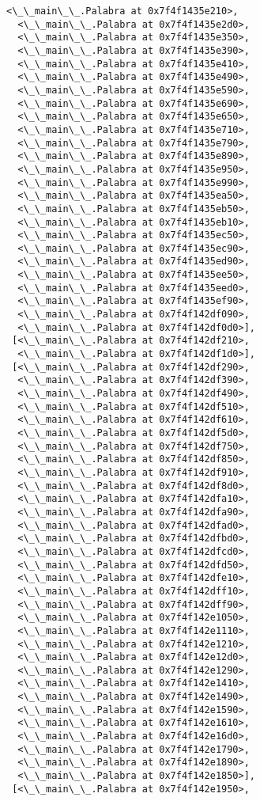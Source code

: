 \documentclass[12pt,a4paper,table]{article}
\begin{document}
\begin{tcolorbox}[breakable, size=fbox, boxrule=.5pt, pad at break*=1mm, opacityfill=0]
\begin{Verbatim}[commandchars=\\\{\}]
  <\_\_main\_\_.Palabra at 0x7f4f1435e210>,
  <\_\_main\_\_.Palabra at 0x7f4f1435e2d0>,
  <\_\_main\_\_.Palabra at 0x7f4f1435e350>,
  <\_\_main\_\_.Palabra at 0x7f4f1435e390>,
  <\_\_main\_\_.Palabra at 0x7f4f1435e410>,
  <\_\_main\_\_.Palabra at 0x7f4f1435e490>,
  <\_\_main\_\_.Palabra at 0x7f4f1435e590>,
  <\_\_main\_\_.Palabra at 0x7f4f1435e690>,
  <\_\_main\_\_.Palabra at 0x7f4f1435e650>,
  <\_\_main\_\_.Palabra at 0x7f4f1435e710>,
  <\_\_main\_\_.Palabra at 0x7f4f1435e790>,
  <\_\_main\_\_.Palabra at 0x7f4f1435e890>,
  <\_\_main\_\_.Palabra at 0x7f4f1435e950>,
  <\_\_main\_\_.Palabra at 0x7f4f1435e990>,
  <\_\_main\_\_.Palabra at 0x7f4f1435ea50>,
  <\_\_main\_\_.Palabra at 0x7f4f1435eb50>,
  <\_\_main\_\_.Palabra at 0x7f4f1435eb10>,
  <\_\_main\_\_.Palabra at 0x7f4f1435ec50>,
  <\_\_main\_\_.Palabra at 0x7f4f1435ec90>,
  <\_\_main\_\_.Palabra at 0x7f4f1435ed90>,
  <\_\_main\_\_.Palabra at 0x7f4f1435ee50>,
  <\_\_main\_\_.Palabra at 0x7f4f1435eed0>,
  <\_\_main\_\_.Palabra at 0x7f4f1435ef90>,
  <\_\_main\_\_.Palabra at 0x7f4f142df090>,
  <\_\_main\_\_.Palabra at 0x7f4f142df0d0>],
 [<\_\_main\_\_.Palabra at 0x7f4f142df210>,
  <\_\_main\_\_.Palabra at 0x7f4f142df1d0>],
 [<\_\_main\_\_.Palabra at 0x7f4f142df290>,
  <\_\_main\_\_.Palabra at 0x7f4f142df390>,
  <\_\_main\_\_.Palabra at 0x7f4f142df490>,
  <\_\_main\_\_.Palabra at 0x7f4f142df510>,
  <\_\_main\_\_.Palabra at 0x7f4f142df610>,
  <\_\_main\_\_.Palabra at 0x7f4f142df5d0>,
  <\_\_main\_\_.Palabra at 0x7f4f142df750>,
  <\_\_main\_\_.Palabra at 0x7f4f142df850>,
  <\_\_main\_\_.Palabra at 0x7f4f142df910>,
  <\_\_main\_\_.Palabra at 0x7f4f142df8d0>,
  <\_\_main\_\_.Palabra at 0x7f4f142dfa10>,
  <\_\_main\_\_.Palabra at 0x7f4f142dfa90>,
  <\_\_main\_\_.Palabra at 0x7f4f142dfad0>,
  <\_\_main\_\_.Palabra at 0x7f4f142dfbd0>,
  <\_\_main\_\_.Palabra at 0x7f4f142dfcd0>,
  <\_\_main\_\_.Palabra at 0x7f4f142dfd50>,
  <\_\_main\_\_.Palabra at 0x7f4f142dfe10>,
  <\_\_main\_\_.Palabra at 0x7f4f142dff10>,
  <\_\_main\_\_.Palabra at 0x7f4f142dff90>,
  <\_\_main\_\_.Palabra at 0x7f4f142e1050>,
  <\_\_main\_\_.Palabra at 0x7f4f142e1110>,
  <\_\_main\_\_.Palabra at 0x7f4f142e1210>,
  <\_\_main\_\_.Palabra at 0x7f4f142e12d0>,
  <\_\_main\_\_.Palabra at 0x7f4f142e1290>,
  <\_\_main\_\_.Palabra at 0x7f4f142e1410>,
  <\_\_main\_\_.Palabra at 0x7f4f142e1490>,
  <\_\_main\_\_.Palabra at 0x7f4f142e1590>,
  <\_\_main\_\_.Palabra at 0x7f4f142e1610>,
  <\_\_main\_\_.Palabra at 0x7f4f142e16d0>,
  <\_\_main\_\_.Palabra at 0x7f4f142e1790>,
  <\_\_main\_\_.Palabra at 0x7f4f142e1890>,
  <\_\_main\_\_.Palabra at 0x7f4f142e1850>],
 [<\_\_main\_\_.Palabra at 0x7f4f142e1950>,

\end{Verbatim}
\end{tcolorbox}
\end{document}
